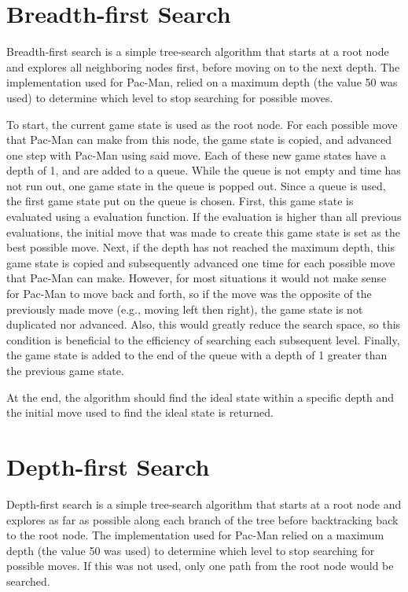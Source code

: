 \documentclass[a4paper,oneside,10pt]{report}
\begin{document}
\section{Breadth-first Search}\label{breadth}

Breadth-first search is a simple tree-search algorithm that starts at a root node and explores all neighboring nodes first, before moving on to the next depth. The implementation used for Pac-Man, relied on a maximum depth (the value 50 was used) to determine which level to stop searching for possible moves. 

To start, the current game state is used as the root node. For each possible move that Pac-Man can make from this node, the game state is copied, and advanced one step with Pac-Man using said move. Each of these new game states have a depth of 1, and are added to a queue. While the queue is not empty and time has not run out, one game state in the queue is popped out. Since a queue is used, the first game state put on the queue is chosen. First, this game state is evaluated using a evaluation function. If the evaluation is higher than all previous evaluations, the initial move that was made to create this game state is set as the best possible move. Next, if the depth has not reached the maximum depth, this game state is copied and subsequently advanced one time for each possible move that Pac-Man can make. However, for most situations it would not make sense for Pac-Man to move back and forth, so if the move was the opposite of the previously made move (e.g., moving left then right), the game state is not duplicated nor advanced. Also, this would greatly reduce the search space, so this condition is beneficial to the efficiency of searching each subsequent level. Finally, the game state is added to the end of the queue with a depth of 1 greater than the previous game state.

At the end, the algorithm should find the ideal state within a specific depth and the initial move used to find the ideal state is returned. 

\section{Depth-first Search}\label{depth}

Depth-first search is a simple tree-search algorithm that starts at a root node and explores as far as possible along each branch of the tree before backtracking back to the root node. The implementation used for Pac-Man relied on a maximum depth (the value 50 was used) to determine which level to stop searching for possible moves. If this was not used, only one path from the root node would be searched.
\end{document}
